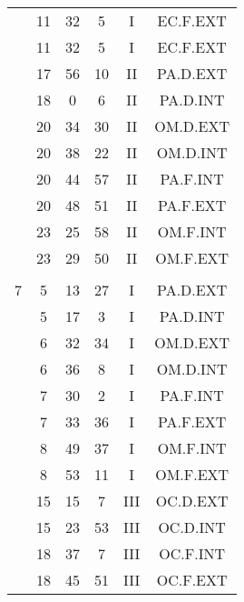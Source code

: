 \documentclass[12pt, a4paper]{article}
\begin{document}
\begin{multicols}{3}
{\begin{tabular}{c c c c c c}
	 	 	 	 & 11 & 32 & 5 & I & EC.F.EXT\\%
	 	 	 	 & 11 & 32 & 5 & I & EC.F.EXT\\%
	 	 	 	 & 17 & 56 & 10 & II & PA.D.EXT\\%
	 	 	 	 & 18 & 0 & 6 & II & PA.D.INT\\%
	 	 	 	 & 20 & 34 & 30 & II & OM.D.EXT\\%
	 	 	 	 & 20 & 38 & 22 & II & OM.D.INT\\%
	 	 	 	 & 20 & 44 & 57 & II & PA.F.INT\\%
	 	 	 	 & 20 & 48 & 51 & II & PA.F.EXT\\%
	 	 	 	 & 23 & 25 & 58 & II & OM.F.INT\\%
	 	 	 	 & 23 & 29 & 50 & II & OM.F.EXT\\%
	 	 	 	 & & & & & \\%
	 	 	 	7 & 5 & 13 & 27 & I & PA.D.EXT\\%
	 	 	 	 & 5 & 17 & 3 & I & PA.D.INT\\%
	 	 	 	 & 6 & 32 & 34 & I & OM.D.EXT\\%
	 	 	 	 & 6 & 36 & 8 & I & OM.D.INT\\%
	 	 	 	 & 7 & 30 & 2 & I & PA.F.INT\\%
	 	 	 	 & 7 & 33 & 36 & I & PA.F.EXT\\%
	 	 	 	 & 8 & 49 & 37 & I & OM.F.INT\\%
	 	 	 	 & 8 & 53 & 11 & I & OM.F.EXT\\%
	 	 	 	 & 15 & 15 & 7 & III & OC.D.EXT\\%
	 	 	 	 & 15 & 23 & 53 & III & OC.D.INT\\%
	 	 	 	 & 18 & 37 & 7 & III & OC.F.INT\\%
	 	 	 	 & 18 & 45 & 51 & III & OC.F.EXT\\%

\end{tabular}}
\end{multicols}
\end{document}

